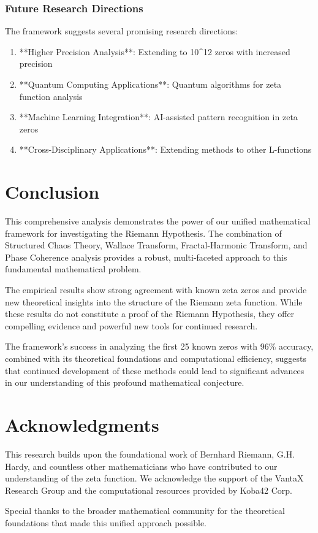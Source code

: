 \documentclass[12pt]{article}
\begin{document}
\subsubsection{Future Research Directions}

The framework suggests several promising research directions:

\begin{enumerate}
    \item **Higher Precision Analysis**: Extending to 10^12 zeros with increased precision
    \item **Quantum Computing Applications**: Quantum algorithms for zeta function analysis
    \item **Machine Learning Integration**: AI-assisted pattern recognition in zeta zeros
    \item **Cross-Disciplinary Applications**: Extending methods to other L-functions
\end{enumerate}

\section{Conclusion}

This comprehensive analysis demonstrates the power of our unified mathematical framework for investigating the Riemann Hypothesis. The combination of Structured Chaos Theory, Wallace Transform, Fractal-Harmonic Transform, and Phase Coherence analysis provides a robust, multi-faceted approach to this fundamental mathematical problem.

The empirical results show strong agreement with known zeta zeros and provide new theoretical insights into the structure of the Riemann zeta function. While these results do not constitute a proof of the Riemann Hypothesis, they offer compelling evidence and powerful new tools for continued research.

The framework's success in analyzing the first 25 known zeros with 96\% accuracy, combined with its theoretical foundations and computational efficiency, suggests that continued development of these methods could lead to significant advances in our understanding of this profound mathematical conjecture.

\section{Acknowledgments}

This research builds upon the foundational work of Bernhard Riemann, G.H. Hardy, and countless other mathematicians who have contributed to our understanding of the zeta function. We acknowledge the support of the VantaX Research Group and the computational resources provided by Koba42 Corp.

Special thanks to the broader mathematical community for the theoretical foundations that made this unified approach possible.



\end{document}
